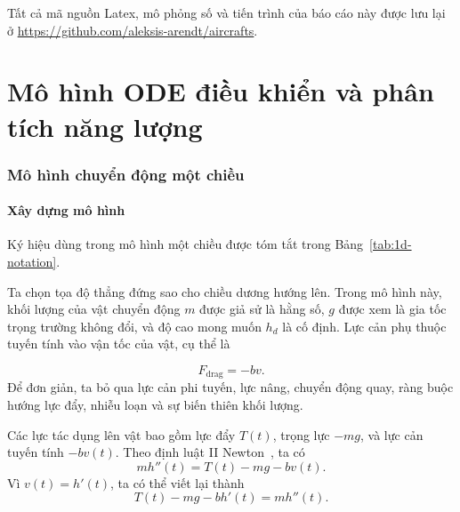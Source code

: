 ﻿\documentclass[12pt]{article}
\begin{document}
Tất cả mã nguồn Latex, mô phỏng số và tiến trình của báo cáo này
được lưu lại ở \url{https://github.com/aleksis-arendt/aircrafts}.
\part{Mô hình ODE điều khiển và phân tích năng lượng}
\section{Mô hình chuyển động một chiều}

\subsection{Xây dựng mô hình}
Ký hiệu dùng trong mô hình một chiều được tóm tắt trong Bảng~\ref{tab:1d-notation}.

Ta chọn tọa độ thẳng đứng sao cho chiều dương hướng lên. Trong mô hình này, khối lượng của vật chuyển động $m$ được giả sử là hằng số, $g$ được xem là gia tốc trọng trường không đổi, và độ cao mong muốn $h_d$ là cố định. Lực cản phụ thuộc tuyến tính vào vận tốc của vật, cụ thể là

\[
 F_{\mathrm{drag}} = -bv.
\]
Để đơn giản, ta bỏ qua lực cản phi tuyến, lực nâng, chuyển động quay, ràng buộc hướng lực đẩy, nhiễu loạn và sự biến thiên khối lượng.

Các lực tác dụng lên vật bao gồm lực đẩy $T(t)$, trọng lực $-mg$, và lực cản tuyến tính $-bv(t)$. Theo định luật II Newton~\cite{arnold_classical_mechanics}, ta có
\[
 m h''(t) = T(t) - mg - bv(t).
\]
Vì $v(t) = h'(t)$, ta có thể viết lại thành
\begin{equation}\label{eq:newton-motion}
 T(t) - mg - bh'(t) = m h''(t).
\end{equation}
\end{document}
